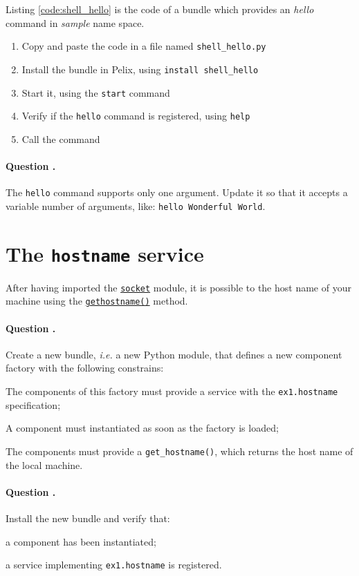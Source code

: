 \documentclass[a4paper, 12pt]{article}
\newcounter{question}
\newcommand\Question{%
  \stepcounter{question}%
  \paragraph{\hspace{2ex} Question \thequestion.}
}
\let\tempone\itemize
\let\temptwo\enditemize
\renewenvironment{itemize}{\tempone\addtolength{\itemsep}{-.5em}}{\temptwo}
\begin{document}
Listing \ref{code:shell_hello} is the code of a bundle which provides an \textit{hello} command in \textit{sample} name space.

\begin{enumerate}
\item Copy and paste the code in a file named \texttt{shell\_hello.py}
\item Install the bundle in Pelix, using \texttt{install shell\_hello}
\item Start it, using the \texttt{start} command
\item Verify if the \texttt{hello} command is registered, using \texttt{help}
\item Call the command
\end{enumerate}

\Question The \texttt{hello} command supports only one argument. Update it so that it accepts a variable number of arguments, like: \texttt{hello Wonderful World}.

\section{The \texttt{hostname} service}

After having imported the \href{https://docs.python.org/3/library/socket.html}{\texttt{socket}} module, it is possible to the host name of your machine using the \href{https://docs.python.org/3/library/socket.html#socket.gethostname}{\texttt{gethostname()}} method.

\Question Create a new bundle, \textit{i.e.} a new Python module, that defines a new component factory with the following constrains:
\begin{itemize}
\item The components of this factory must provide a service with the \texttt{ex1.hostname} specification;
\item A component must instantiated as soon as the factory is loaded;
\item The components must provide a \texttt{get\_hostname()}, which returns the host name of the local machine.
\end{itemize}

\Question Install the new bundle and verify that:
\begin{itemize}
\item a component has been instantiated;
\item a service implementing \texttt{ex1.hostname} is registered.
\end{itemize}
\end{document}
